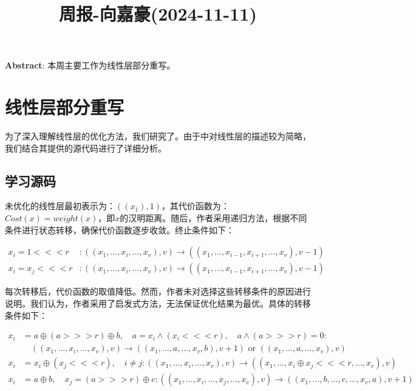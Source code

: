 \documentclass[11pt,a4paper]{article}
\title{周报-向嘉豪(2024-11-11)}
\newcommand{\lll}{\mathrel{<\!\!<\!\!<}}
\newcommand{\ggg}{\mathrel{>\!\!>\!\!>}}
\renewcommand{\maketitle}{
  \begin{center}
    \LARGE\bfseries\thetitle
  \end{center}
}
\begin{document}
\maketitle


\noindent \textbf{Abstract}: 本周主要工作为线性层部分重写。


\section{线性层部分重写}

为了深入理解线性层的优化方法，我们研究了\cite{Leurent2024}。由于\cite{Leurent2024}中对线性层的描述较为简略，我们结合其提供的源代码进行了详细分析。

\subsection{学习\cite{Leurent2024}源码}

未优化的线性层最初表示为：$((x_1), 1)$，其代价函数为：$Cost(x) = weight(x)$，即$x$的汉明距离。随后，作者采用递归方法，根据不同条件进行状态转移，确保代价函数逐步收敛。终止条件如下：

\begin{align*}
x_{i} = 1 \lll r & : ((x_1, \dots, x_{i}, \dots, x_v), v) \rightarrow ((x_1, \dots, x_{i-1}, x_{i+1}, \dots, x_v), v-1) \\
x_{i} = x_{j} \lll r & : ((x_1, \dots, x_{i}, \dots, x_v), v) \rightarrow ((x_1, \dots, x_{i-1}, x_{i+1}, \dots, x_v), v-1)
\end{align*}

每次转移后，代价函数的取值降低。然而，作者未对选择这些转移条件的原因进行说明。我们认为，作者采用了启发式方法，无法保证优化结果为最优。具体的转移条件如下：

\begin{align*}
x_i &= a \oplus (a \ggg r) \oplus b, \quad a = x_i \land (x_i \lll r), \quad a \land (a \ggg r) = 0 : \nonumber \\
&\quad ((x_1, \dots, x_{i}, \dots, x_v), v) \rightarrow ((x_1, \dots, a, \dots, x_v, b), v+1) \text{ or } ((x_1, \dots, a, \dots, x_v), v) \\
x_{i} &= x_{i} \oplus (x_{j} \lll r), \quad i \neq j : ((x_1, \dots, x_{i}, \dots, x_v), v) \rightarrow ((x_1, \dots, x_{i} \oplus x_{j} \lll r, \dots, x_v), v) \\
x_i &= a \oplus b, \quad x_j = (a \ggg r) \oplus c : ((x_1, \dots, x_{i}, \dots, x_{j}, \dots, x_v), v) \rightarrow ((x_1, \dots, b, \dots, c, \dots, x_v, a), v+1)
\end{align*}
\end{document}

